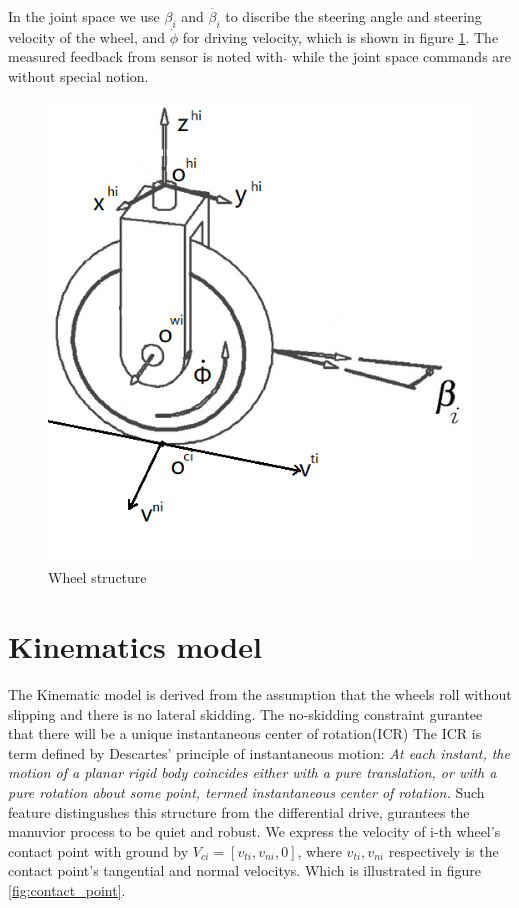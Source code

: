 In the joint space we use $\beta_{i}$ and $\dot{\beta_{i}}$ to discribe the steering angle and steering velocity of the wheel, and $\dot{\phi}$ for driving velocity, which is shown in figure \cref{fig:wheel}. The measured
feedback from sensor is noted with $\hat{}$ while the joint space commands are without special notion. 

\begin{figure}[t]
\begin{center}
\includegraphics[width=.7\textwidth]{../Figures/wheel.png}
\caption{Wheel structure}
\label{fig:wheel}
\end{center}
\end{figure}




\section{Kinematics model}
\label{sec:Kinematics}
The Kinematic model is derived from the assumption that the wheels roll without slipping and there is no lateral skidding. The no-skidding constraint gurantee that there will be a unique instantaneous center of rotation(ICR) 
The ICR is term defined by Descartes' principle of instantaneous motion: 
\textit{At each instant, the motion of a planar rigid body coincides either with a pure translation, or with a pure rotation about some point, termed 
instantaneous center of rotation.}
Such feature distingushes this structure from the differential drive, gurantees the manuvior process to be quiet and robust.
We express the velocity of i-th wheel's contact point with ground by $V_{ci}=[v_{ti},v_{ni},0]$, where $v_{ti},v_{ni}$ respectively is the contact point's  tangential and normal velocitys. Which is illustrated in 
figure \cref{fig:contact_point}.



